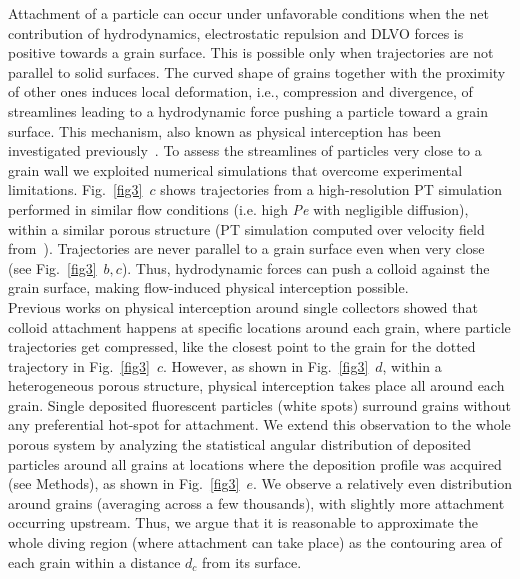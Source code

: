 \documentclass[singlecolumn,pre,notitlepage,preprintnumbers,floatfix,superscriptaddress]{revtex4-1}
\begin{document}
\noindent
Attachment of a particle can occur under unfavorable conditions when the net contribution of hydrodynamics, electrostatic repulsion and DLVO forces is positive towards a grain surface. This is possible only when trajectories are not parallel to solid surfaces. The curved shape of grains together with the proximity of other ones induces local deformation, i.e., compression and divergence, of streamlines leading to a hydrodynamic force pushing a particle toward a grain surface. This mechanism, also known as physical interception has been investigated previously~\cite{Herve2015,pradel_EST_2024}. To assess the streamlines of particles very close to a grain wall we exploited numerical simulations that overcome experimental limitations. Fig.~\ref{fig3}~$c$ shows trajectories from a high-resolution PT simulation performed in similar flow conditions (i.e. high \textit{Pe} with negligible diffusion), within a similar porous structure (PT simulation computed over velocity field from~\cite{deAnnaPRF2017}). Trajectories are never parallel to a grain surface even when very close (see Fig.~\ref{fig3}~$b,c$). Thus, hydrodynamic forces can push a colloid against the grain surface, making flow-induced physical interception possible. \\

\noindent
Previous works on physical interception around single collectors showed that colloid attachment happens at specific locations around each grain, where particle trajectories get compressed, like the closest point to the grain for the dotted trajectory in Fig.~\ref{fig3}~$c$. However, as shown in Fig.~\ref{fig3}~$d$, within a heterogeneous porous structure, physical interception takes place all around each grain. Single deposited fluorescent particles (white spots) surround grains without any preferential hot-spot for attachment. We extend this observation to the whole porous system by analyzing the statistical angular distribution of deposited particles around all grains at locations where the deposition profile was acquired (see Methods), as shown in Fig.~\ref{fig3}~$e$. We observe a relatively even distribution around grains (averaging across a few thousands), with slightly more attachment occurring upstream. Thus, we argue that it is reasonable to approximate the whole diving region (where attachment can take place) as the contouring area of each grain within a distance $d_c$ from its surface. \\
\end{document}
